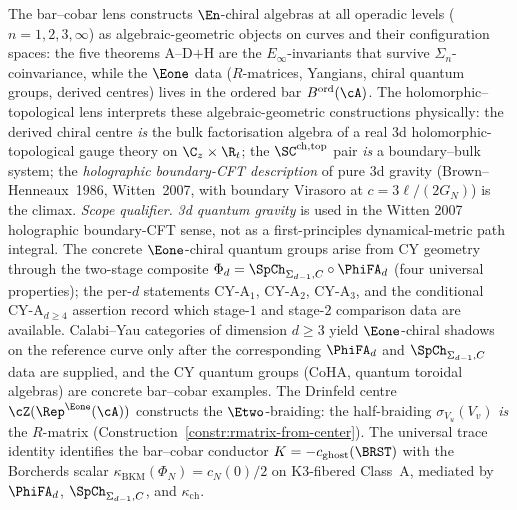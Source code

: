 \begin{remark}
\label{rem:vol3-dimensional-reduction}
The bar--cobar lens constructs $\En$-chiral algebras at all operadic
levels ($n = 1, 2, 3, \infty$) as algebraic-geometric objects
on curves and their configuration spaces: the five theorems
A--D$+$H are the $E_\infty$-invariants that survive
$\Sigma_n$-coinvariance, while the $\Eone$ data
($R$-matrices, Yangians, chiral quantum groups, derived
centres) lives in the ordered bar $B^{\mathrm{ord}}(\cA)$.
The holomorphic--topological lens interprets these algebraic-geometric
constructions physically: the derived chiral centre \emph{is} the bulk
factorisation algebra of a real 3d holomorphic-topological
gauge theory on $\C_z \times \R_t$; the
$\SC^{\mathrm{ch,top}}$ pair \emph{is} a boundary--bulk system;
the \emph{holographic boundary-CFT description} of pure 3d
gravity (Brown--Henneaux~1986, Witten~2007, with boundary
Virasoro at $c = 3\ell/(2G_{N})$) is the climax. \emph{Scope
qualifier.} \emph{3d quantum gravity} is used in the Witten 2007
holographic boundary-CFT sense, not as a first-principles
	dynamical-metric path integral. The concrete $\Eone$-chiral
quantum groups arise from CY geometry through the two-stage
composite
$\Phi_d = \SpCh_{\Sigma_{d-1}, C}\circ\PhiFA_d$ (four
universal properties); the per-$d$ statements CY-A$_1$,
CY-A$_2$, CY-A$_3$, and the conditional CY-A$_{d \ge 4}$
assertion record which stage-$1$ and stage-$2$ comparison data are
available.
Calabi--Yau categories of dimension $d \geq 3$ yield $\Eone$-chiral
shadows on the reference curve only after the corresponding
$\PhiFA_d$ and $\SpCh_{\Sigma_{d-1}, C}$ data are supplied, and the
CY quantum groups (CoHA,
quantum toroidal algebras) are concrete bar--cobar examples. The
Drinfeld centre $\cZ(\Rep^{\Eone}(\cA))$ constructs the
$\Etwo$-braiding: the half-braiding $\sigma_{V_u}(V_v)$
\emph{is} the $R$-matrix
(Construction~\ref{constr:rmatrix-from-center}). The universal trace
identity identifies the bar--cobar conductor
\(K=-c_{\mathrm{ghost}}(\BRST)\) with the Borcherds scalar
\(\kappa_{\mathrm{BKM}}(\Phi_N)=c_N(0)/2\) on K3-fibered Class~A, mediated by
\(\PhiFA_d\), \(\SpCh_{\Sigma_{d-1},C}\), and
\(\kappa_{\mathrm{ch}}\).
\end{remark}

